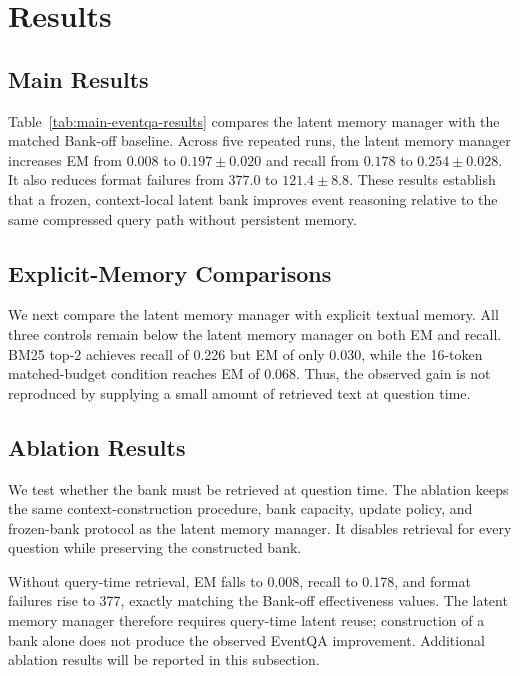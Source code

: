 \section{Results}
\label{sec:results}

\subsection{Main Results}

Table~\ref{tab:main-eventqa-results} compares the latent memory manager with the matched Bank-off baseline. Across five repeated runs, the latent memory manager increases EM from $0.008$ to $0.197\pm0.020$ and recall from $0.178$ to $0.254\pm0.028$. It also reduces format failures from $377.0$ to $121.4\pm8.8$. These results establish that a frozen, context-local latent bank improves event reasoning relative to the same compressed query path without persistent memory.



\subsection{Explicit-Memory Comparisons}

We next compare the latent memory manager with explicit textual memory. All three controls remain below the latent memory manager on both EM and recall. BM25 top-2 achieves recall of 0.226 but EM of only 0.030, while the 16-token matched-budget condition reaches EM of 0.068. Thus, the observed gain is not reproduced by supplying a small amount of retrieved text at question time.



\subsection{Ablation Results}
\label{sec:ablation-results}

We test whether the bank must be retrieved at question time. The ablation keeps the same context-construction procedure, bank capacity, update policy, and frozen-bank protocol as the latent memory manager. It disables retrieval for every question while preserving the constructed bank.

Without query-time retrieval, EM falls to 0.008, recall to 0.178, and format failures rise to 377, exactly matching the Bank-off effectiveness values. The latent memory manager therefore requires query-time latent reuse; construction of a bank alone does not produce the observed EventQA improvement. Additional ablation results will be reported in this subsection.

